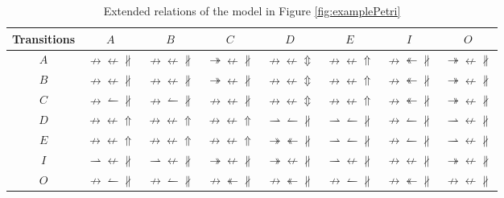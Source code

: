 \documentclass[dvips,...]{llncs}
\begin{document}
\begin{table}[htbp]
\caption{Extended relations of the model in Figure \ref{fig:examplePetri}\label{tab:example_relations}}
\centering
	\begin{tabular}{c|c|c|c|c|c|c|c} \hline
		Transitions & $A$ & $B$ & $C$ & $D$ & $E$ & $I$ & $O$\\ \hline
		$A$ 
			& $\nrightarrow\nleftarrow\nparallel$
			& $\nrightarrow\nleftarrow\nparallel$
			& $\twoheadrightarrow\nleftarrow\nparallel$
			& $\nrightarrow\nleftarrow\Updownarrow$
			& $\nrightarrow\nleftarrow\Uparrow$
			& $\nrightarrow\twoheadleftarrow\nparallel$
			& $\twoheadrightarrow\nleftarrow\nparallel$
			\\ \hline
		$B$ 
			& $\nrightarrow\nleftarrow\nparallel$
			& $\nrightarrow\nleftarrow\nparallel$
			& $\twoheadrightarrow\nleftarrow\nparallel$
			& $\nrightarrow\nleftarrow\Updownarrow$
			& $\nrightarrow\nleftarrow\Uparrow$
			& $\nrightarrow\twoheadleftarrow\nparallel$
			& $\twoheadrightarrow\nleftarrow\nparallel$
			\\ \hline
		$C$ 
			& $\nrightarrow\leftharpoonup\nparallel$
			& $\nrightarrow\leftharpoonup\nparallel$
			& $\nrightarrow\nleftarrow\nparallel$
			& $\nrightarrow\nleftarrow\Updownarrow$
			& $\nrightarrow\nleftarrow\Uparrow$
			& $\nrightarrow\twoheadleftarrow\nparallel$
			& $\twoheadrightarrow\nleftarrow\nparallel$
			\\ \hline
		$D$ 
			& $\nrightarrow\nleftarrow\Uparrow$
			& $\nrightarrow\nleftarrow\Uparrow$
			& $\nrightarrow\nleftarrow\Uparrow$
			& $\rightharpoonup\leftharpoonup\nparallel$
			& $\rightharpoonup\leftharpoonup\nparallel$
			& $\nrightarrow\leftharpoonup\nparallel$
			& $\rightharpoonup\nleftarrow\nparallel$
			\\ \hline
		$E$ 
			& $\nrightarrow\nleftarrow\Uparrow$
			& $\nrightarrow\nleftarrow\Uparrow$
			& $\nrightarrow\nleftarrow\Uparrow$
			& $\twoheadrightarrow\twoheadleftarrow\nparallel$
			& $\rightharpoonup\leftharpoonup\nparallel$
			& $\nrightarrow\leftharpoonup\nparallel$
			& $\rightharpoonup\nleftarrow\nparallel$
			\\ \hline
		$I$ 
			& $\rightharpoonup\nleftarrow\nparallel$
			& $\rightharpoonup\nleftarrow\nparallel$
			& $\twoheadrightarrow\nleftarrow\nparallel$
			& $\twoheadrightarrow\nleftarrow\nparallel$
			& $\rightharpoonup\nleftarrow\nparallel$
			& $\nrightarrow\nleftarrow\nparallel$
			& $\twoheadrightarrow\nleftarrow\nparallel$
			\\ \hline
		$O$ 
			& $\nrightarrow\leftharpoonup\nparallel$
			& $\nrightarrow\leftharpoonup\nparallel$
			& $\nrightarrow\twoheadleftarrow\nparallel$
			& $\nrightarrow\twoheadleftarrow\nparallel$
			& $\nrightarrow\leftharpoonup\nparallel$
			& $\nrightarrow\twoheadleftarrow\nparallel$
			& $\nrightarrow\nleftarrow\nparallel$
			\\ \hline
	\end{tabular}
\end{table}
\end{document}
